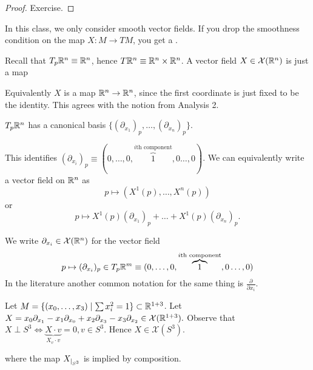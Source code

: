 \begin{proof}
    Exercise.
\end{proof}

\begin{remark}
    In this class, we only consider smooth vector fields. If you drop the smoothness condition on the map \(X:M\to TM\),
    you get a . 
\end{remark}

\begin{example}
    Recall that \(T_p\mathbb{R}^n\equiv \mathbb{R}^n\), hence \(T\mathbb{R}^n\equiv \mathbb{R}^n\times \mathbb{R}^n\).
    A vector field \(X\in\mathcal{X}(\mathbb{R}^n)\) is just a map  
    \begin{center}
    \end{center}
    Equivalently \(X\) is a map \(\mathbb{R}^n\to\mathbb{R}^n\), since the first coordinate is just fixed to be the 
    identity. This agrees with the notion from Analysis 2. 
\end{example}

\begin{remark}
    \(T_p\mathbb{R}^n\) has a canonical basis \(\{(\partial_{x_1})_p,\dots,(\partial_{x_n})_p\}\).
    
    This identifies 
    \((\partial_{x_i})_p\equiv (0,\dots,0,\overbrace{1}^{i\text{th component}},0\dots,0)\). We can equivalently 
    write a vector field on \(\mathbb{R}^n\) as \[p\mapsto (X^1(p),\dots,X^n(p))\]
    or 
    \[p\mapsto X^1(p)(\partial_{x_1})_p+\dots+X^1(p)(\partial_{x_n})_p.\]
\end{remark}

 We write \(\partial_{x_i}\in\mathcal{X}(\mathbb{R}^n)\) for the vector field 
\[p \mapsto (\partial_{x_i})_p\in T_p\mathbb{R}^m\equiv (0,\dots,0,\overbrace{1}^{i\text{th component}},0\dots,0)\]
In the literature another common notation for the same thing is \(\frac{\partial}{\partial x_i}\).

\begin{example}
    Let \(M=\{(x_0,\dots,x_3)\mid \sum x_i^2=1\}\subset\mathbb{R}^{1+3}\). Let \(X=x_0\partial_{x_1}-x_1\partial_{x_0}+x_2\partial_{x_3}-x_3\partial_{x_2}\in \mathcal{X}(\mathbb{R}^{1+3}).\)
    Observe that \(X\perp S^3 \iff \underbrace{X\cdot v}_{X_v\cdot v} = 0, v\in S^3.\) Hence \(X \in \mathcal{X}(S^3)\).
    \begin{center}
    \end{center}
    where the map \(X_{|_{S^3}}\) is implied by composition.
\end{example}

